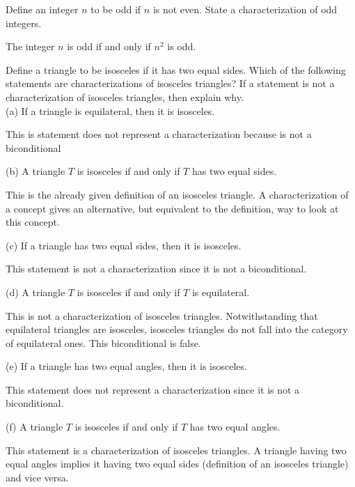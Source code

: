 \documentclass[12pt]{article}
\newenvironment{problem}[2][Problem]{\begin{trivlist}
		\item[\hskip \labelsep {\bfseries #1}\hskip \labelsep {\bfseries #2.}]}{\end{trivlist}}
\newenvironment{solution}[2][Solution]{\begin{trivlist}
		\item[\hskip \labelsep {\bfseries #1}\hskip \labelsep {\bfseries #2.}]}{\end{trivlist}}
\begin{document}
	\begin{problem}{81}
		Define an integer $n$ to be odd if $n$ is not even. State a characterization of odd integers.
		\begin{solution}{}
			The integer $n$ is odd if and only if $n^{2}$ is odd. 
		\end{solution}
	\end{problem}
	\begin{problem}{82}
		Define a triangle to be isosceles if it has two equal sides. Which of the following statements are characterizations of isosceles triangles? If a statement is not a characterization of isosceles triangles, then explain why.\\
		
		(a) If a triangle is equilateral, then it is isosceles.
		\begin{solution}{a}
			This is statement does not represent a characterization because is not a biconditional	
		\end{solution}
	
		(b) A triangle $T$ is isosceles if and only if $T$ has two equal sides. 
		\begin{solution}{b}
			This is the already given definition of an isosceles triangle. A characterization of a concept gives an alternative, but equivalent to the definition, way to look at this concept.
		\end{solution}
	
		(c) If a triangle has two equal sides, then it is isosceles.
		\begin{problem}{c}
			This statement is not a characterization since it is not a biconditional.
		\end{problem}
	
		(d) A triangle $T$ is isosceles if and only if $T$ is equilateral.
		\begin{problem}{d}
			This is not a characterization of isosceles triangles. Notwithstanding that equilateral triangles are isosceles, isosceles triangles do not fall into the category of equilateral ones. This biconditional is false.
		\end{problem}
	
		(e) If a triangle has two equal angles, then it is isosceles.
		\begin{solution}{e}
			This statement does not represent a characterization since it is not a biconditional.
		\end{solution}
	
		(f) A triangle $T$ is isosceles if and only if $T$ has two equal angles.
		\begin{solution}{f}
			This statement is a characterization of isosceles triangles. A triangle having two equal angles implies it having two equal sides (definition of an isosceles triangle) and vice versa. 
		\end{solution}
	\end{problem}
	
\end{document}
